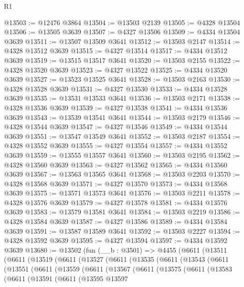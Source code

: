 \begin{lexlean}{R1}
\begin{coremodule}
@13503 := @12476 @3864
@13504 := @13503 @2139
@13505 := @4328 @13504
@13506 := @13505 @3639
@13507 := @4327 @13506
@13509 := @4334 @13504 @3639
@13511 := @13507 @13509 @3641
@13512 := @13503 @2147
@13514 := @4328 @13512 @3639
@13515 := @4327 @13514
@13517 := @4334 @13512 @3639
@13519 := @13515 @13517 @3641
@13520 := @13503 @2155
@13522 := @4328 @13520 @3639
@13523 := @4327 @13522
@13525 := @4334 @13520 @3639
@13527 := @13523 @13525 @3641
@13528 := @13503 @2163
@13530 := @4328 @13528 @3639
@13531 := @4327 @13530
@13533 := @4334 @13528 @3639
@13535 := @13531 @13533 @3641
@13536 := @13503 @2171
@13538 := @4328 @13536 @3639
@13539 := @4327 @13538
@13541 := @4334 @13536 @3639
@13543 := @13539 @13541 @3641
@13544 := @13503 @2179
@13546 := @4328 @13544 @3639
@13547 := @4327 @13546
@13549 := @4334 @13544 @3639
@13551 := @13547 @13549 @3641
@13552 := @13503 @2187
@13554 := @4328 @13552 @3639
@13555 := @4327 @13554
@13557 := @4334 @13552 @3639
@13559 := @13555 @13557 @3641
@13560 := @13503 @2195
@13562 := @4328 @13560 @3639
@13563 := @4327 @13562
@13565 := @4334 @13560 @3639
@13567 := @13563 @13565 @3641
@13568 := @13503 @2203
@13570 := @4328 @13568 @3639
@13571 := @4327 @13570
@13573 := @4334 @13568 @3639
@13575 := @13571 @13573 @3641
@13576 := @13503 @2211
@13578 := @4328 @13576 @3639
@13579 := @4327 @13578
@13581 := @4334 @13576 @3639
@13583 := @13579 @13581 @3641
@13584 := @13503 @2219
@13586 := @4328 @13584 @3639
@13587 := @4327 @13586
@13589 := @4334 @13584 @3639
@13591 := @13587 @13589 @3641
@13592 := @13503 @2227
@13594 := @4328 @13592 @3639
@13595 := @4327 @13594
@13597 := @4334 @13592 @3639
@13680 := @13502
    (fun (__b : @3501) =>
    @4455
      (@6611
        (@13511
          (@6611
            (@13519
              (@6611
                (@13527
                  (@6611
                    (@13535
                      (@6611
                        (@13543
                          (@6611
                            (@13551
                              (@6611
                                (@13559
                                  (@6611
                                    (@13567
                                      (@6611
                                        (@13575
                                          (@6611
                                            (@13583
                                              (@6611
                                                (@13591
                                                  (@6611
                                                    (@13595
                                                      @13597

\end{coremodule}
\end{lexlean}
